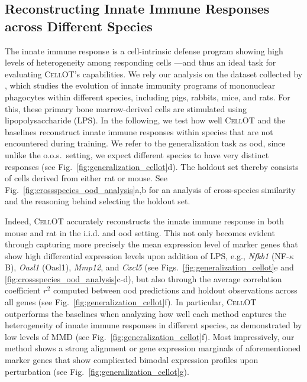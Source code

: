 \subsection{Reconstructing Innate Immune Responses across Different Species}

The innate immune response is a cell-intrinsic defense program showing high levels of heterogeneity among responding cells ---and thus an ideal task for evaluating \textsc{CellOT}'s capabilities. We rely our analysis on the dataset collected by \citet{hagai2018gene}, which studies the evolution of innate immunity programs of mononuclear phagocytes within different species, including pigs, rabbits, mice, and rats. For this, these primary bone marrow-derived cells are stimulated using lipopolysaccharide (LPS).
In the following, we test how well \textsc{CellOT} and the baselines reconstruct innate immune responses within species that are not encountered during training. We refer to the generalization task as \acrfull{ood}, since unlike the o.o.s.~setting, we expect different species to have very distinct responses (see Fig.~\ref{fig:generalization_cellot}d).
The holdout set thereby consists of cells derived from either rat or mouse. See Fig.~\ref{fig:crossspecies_ood_analysis}a,b for an analysis of cross-species similarity and the reasoning behind selecting the holdout set.

Indeed, \textsc{CellOT} accurately reconstructs the innate immune response in both mouse and rat in the i.i.d. and \acrshort{ood} setting. This not only becomes evident through capturing more precisely the mean expression level of marker genes that show high differential expression levels upon addition of LPS, e.g., \textit{Nfkb1} (NF-$\kappa$B), \textit{Oasl1} (Oasl1), \textit{Mmp12}, and \textit{Cxcl5} (see Figs.~\ref{fig:generalization_cellot}e and \ref{fig:crossspecies_ood_analysis}c-d), but also through the average correlation coefficient $r^2$ computed between \acrshort{ood} predictions and holdout observations across all genes (see Fig.~\ref{fig:generalization_cellot}f).
In particular, \textsc{CellOT} outperforms the baselines when analyzing how well each method captures the heterogeneity of innate immune responses in different species, as demonstrated by low levels of \acrshort{MMD} (see Fig.~\ref{fig:generalization_cellot}f).
Most impressively, our method shows a strong alignment or gene expression marginals of aforementioned marker genes that show complicated bimodal expression profiles upon perturbation (see Fig.~\ref{fig:generalization_cellot}g).


